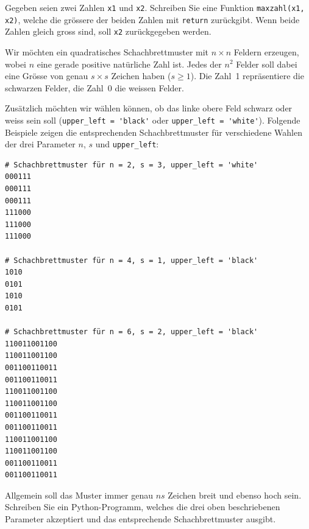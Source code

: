 \begin{myexercise}
	Gegeben seien zwei Zahlen \lstinline|x1| und \lstinline|x2|. Schreiben Sie eine Funktion \lstinline|maxzahl(x1, x2)|, welche die grössere der beiden Zahlen mit \lstinline|return| zurückgibt. Wenn beide Zahlen gleich gross sind, soll \lstinline|x2| zurückgegeben werden.

	\begin{myanswer}
		
	\end{myanswer}
\end{myexercise}

\begin{mychallenge}


	Wir möchten ein quadratisches Schachbrettmuster mit $n \times n$ Feldern erzeugen, wobei $n$ eine gerade positive natürliche Zahl ist. Jedes der $n^2$ Felder soll dabei eine Grösse von genau $s \times s$ Zeichen haben ($s \geq 1$). Die Zahl~1 repräsentiere die schwarzen Felder, die Zahl~0 die weissen Felder.

	Zusätzlich möchten wir wählen können, ob das linke obere Feld schwarz oder weiss sein soll (\lstinline|upper_left = 'black'| oder \lstinline|upper_left = 'white'|). Folgende Beispiele zeigen die entsprechenden Schachbrettmuster für verschiedene Wahlen der drei Parameter $n$, $s$ und \lstinline|upper_left|:

	\begin{verbatim}
# Schachbrettmuster für n = 2, s = 3, upper_left = 'white'
000111
000111
000111
111000
111000
111000

# Schachbrettmuster für n = 4, s = 1, upper_left = 'black'
1010
0101
1010
0101

# Schachbrettmuster für n = 6, s = 2, upper_left = 'black'
110011001100
110011001100
001100110011
001100110011
110011001100
110011001100
001100110011
001100110011
110011001100
110011001100
001100110011
001100110011
\end{verbatim}

	Allgemein soll das Muster immer genau $ns$ Zeichen breit und ebenso hoch sein. Schreiben Sie ein Python-Programm, welches die drei oben beschriebenen Parameter akzeptiert und das entsprechende Schachbrettmuster ausgibt.
	\begin{myanswer}
		
	\end{myanswer}
\end{mychallenge}

